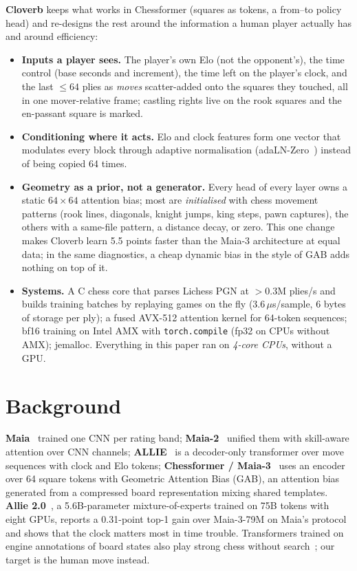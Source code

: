 \textbf{Cloverb} keeps what works in Chessformer (squares as tokens, a from--to policy head) and
re-designs the rest around the information a human player actually has and around efficiency:
\begin{itemize}
\item \textbf{Inputs a player sees.} The player's own Elo (not the opponent's), the time control
(base seconds and increment), the time left on the player's clock, and the last $\le 64$ plies as
\emph{moves} scatter-added onto the squares they touched, all in one mover-relative frame; castling
rights live on the rook squares and the en-passant square is marked.
\item \textbf{Conditioning where it acts.} Elo and clock features form one vector that modulates
every block through adaptive normalisation (adaLN-Zero~\cite{dit}) instead of being copied 64 times.
\item \textbf{Geometry as a prior, not a generator.} Every head of every layer owns a static
$64\times64$ attention bias; most are \emph{initialised} with chess movement patterns (rook lines,
diagonals, knight jumps, king steps, pawn captures), the others with a same-file pattern, a distance
decay, or zero. This one change makes Cloverb learn 5.5 points faster than the Maia-3 architecture at
equal data; in the same diagnostics, a cheap dynamic bias in the style of GAB adds nothing on top of it.
\item \textbf{Systems.} A C chess core that parses Lichess PGN at $>$0.3M plies/s and builds training
batches by replaying games on the fly (3.6\,$\mu$s/sample, 6 bytes of storage per ply); a fused
AVX-512 attention kernel for 64-token sequences; bf16 training on Intel AMX with
\texttt{torch.compile} (fp32 on CPUs without AMX); jemalloc. Everything in this paper ran on
\emph{4-core CPUs}, without a GPU.
\end{itemize}

\section{Background}
\textbf{Maia}~\cite{maia1} trained one CNN per rating band; \textbf{Maia-2}~\cite{maia2} unified them
with skill-aware attention over CNN channels; \textbf{ALLIE}~\cite{allie} is a decoder-only
transformer over move sequences with clock and Elo tokens; \textbf{Chessformer / Maia-3}~\cite{chessformer}
uses an encoder over 64 square tokens with Geometric Attention Bias (GAB), an attention bias
generated from a compressed board representation mixing shared templates. \textbf{Allie 2.0}~\cite{allie2},
a 5.6B-parameter mixture-of-experts trained on 75B tokens with eight GPUs, reports a 0.31-point
top-1 gain over Maia-3-79M on Maia's protocol and shows that the clock matters most in time trouble.
Transformers trained on engine annotations of board states also play strong chess without
search~\cite{ruoss}; our target is the human move instead.


